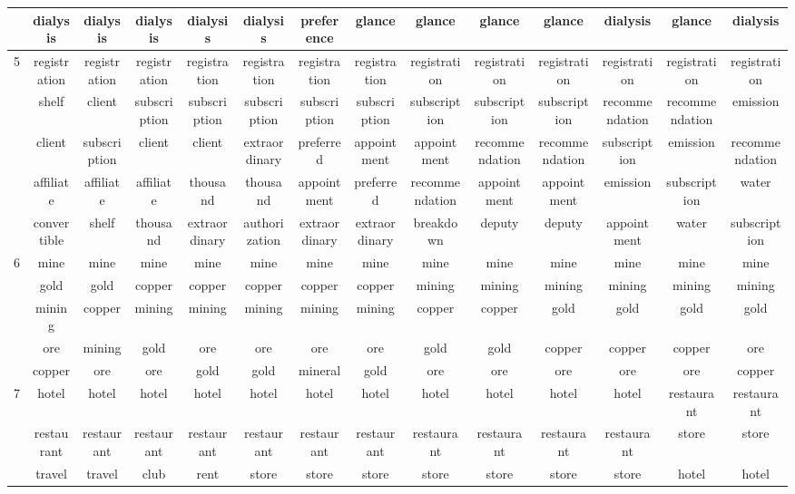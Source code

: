 \documentclass[12pt,journal,letterpaper,oneside,onecolumn]{IEEEtran}
\begin{document}
\begin{center}
{\begin{tabular}{c|c|c|c|c|c|c|c|c|c|c|c|c|c}
         & dialysis & dialysis & dialysis & dialysis & dialysis & preference & glance & glance & glance & glance & dialysis & glance & dialysis \\ 
        \hline
        5 & registration & registration & registration & registration & registration & registration & registration & registration & registration & registration & registration & registration & registration \\ 
         & shelf & client & subscription & subscription & subscription & subscription & subscription & subscription & subscription & subscription & recommendation & recommendation & emission \\ 
         & client & subscription & client & client & extraordinary & preferred & appointment & appointment & recommendation & recommendation & subscription & emission & recommendation \\ 
         & affiliate & affiliate & affiliate & thousand & thousand & appointment & preferred & recommendation & appointment & appointment & emission & subscription & water \\ 
         & convertible & shelf & thousand & extraordinary & authorization & extraordinary & extraordinary & breakdown & deputy & deputy & appointment & water & subscription \\ 
        \hline
        6 & mine & mine & mine & mine & mine & mine & mine & mine & mine & mine & mine & mine & mine \\ 
         & gold & gold & copper & copper & copper & copper & copper & mining & mining & mining & mining & mining & mining \\ 
         & mining & copper & mining & mining & mining & mining & mining & copper & copper & gold & gold & gold & gold \\ 
         & ore & mining & gold & ore & ore & ore & ore & gold & gold & copper & copper & copper & ore \\ 
         & copper & ore & ore & gold & gold & mineral & gold & ore & ore & ore & ore & ore & copper \\ 
        \hline
        7 & hotel & hotel & hotel & hotel & hotel & hotel & hotel & hotel & hotel & hotel & hotel & restaurant & restaurant \\ 
         & restaurant & restaurant & restaurant & restaurant & restaurant & restaurant & restaurant & restaurant & restaurant & restaurant & restaurant & store & store \\ 
         & travel & travel & club & rent & store & store & store & store & store & store & store & hotel & hotel \\ 

\end{tabular}}
\end{center}
\end{document}
